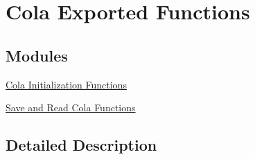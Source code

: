 \hypertarget{group___cola___exported___functions}{}\section{Cola Exported Functions}
\label{group___cola___exported___functions}
\subsection*{Modules}
\begin{DoxyCompactItemize}
\item 
\hyperlink{group___cola___exported___functions___group1}{Cola Initialization Functions}
\item 
\hyperlink{group___cola___exported___functions___group2}{Save and Read Cola Functions}
\end{DoxyCompactItemize}


\subsection{Detailed Description}
